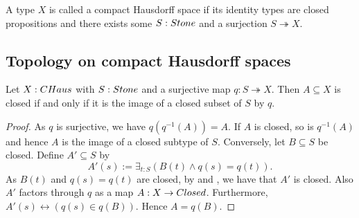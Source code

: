 \begin{definition}
  A type $X$ is called a compact Hausdorff space if its identity types are closed propositions and there exists some $S:\Stone$ and a surjection $S\twoheadrightarrow X$.
\end{definition}


\subsection{Topology on compact Hausdorff spaces}

\begin{lemma}\label{CompactHausdorffClosed}
  Let $X:\CHaus$ with $S:\Stone$ and a surjective map $q:S\twoheadrightarrow X$.
  Then $A\subseteq X$ is closed if and only if it is the image of a closed subset of $S$ by $q$. 
\end{lemma}
\begin{proof}
  As $q$ is surjective, we have $q(q^{-1}(A)) = A$.
  If $A$ is closed, so is $q^{-1}(A)$ and 
  hence $A$ is the image of a closed subtype of $S$. 
  Conversely, let $B\subseteq S$ be closed. 
  Define $A'\subseteq S$ by 
  \[A'(s) := \exists_{t:S} (B(t) \wedge q(s) = q(t)).\]
  As $B(t)$ and $q(s) = q(t)$ are closed, by  and , 
  we have that $A'$ is closed. 
  Also $A'$ factors through $q$ as a map $A: X\to \Closed$.
  Furthermore, $A'(s) \leftrightarrow (q(s)\in q(B))$. 
  Hence $A=q(B)$. 
\end{proof}

